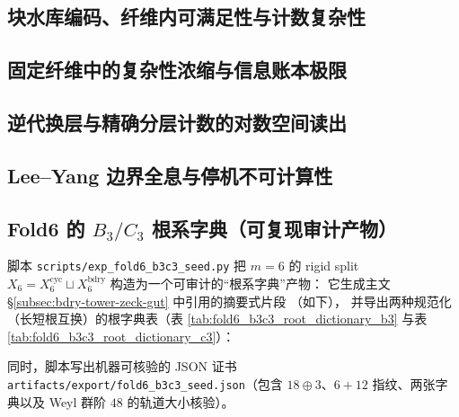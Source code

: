 \subsection{块水库编码、纤维内可满足性与计数复杂性}\label{subsec:fold-computability-block-foldsat}


\subsection{固定纤维中的复杂性浓缩与信息账本极限}\label{subsec:fold-computability-fixed-fiber-ledger-complexity}



\subsection{逆代换层与精确分层计数的对数空间读出}\label{subsec:fold-computability-fiber-level-count-logspace}


\subsection{Lee--Yang 边界全息与停机不可计算性}\label{subsec:fold-computability-leyang-halting-holography}



\subsection{Fold6 的 \texorpdfstring{$B_3/C_3$}{B3/C3} 根系字典（可复现审计产物）}
\label{app:fold6-b3c3-seed-dictionary}

脚本 \texttt{scripts/exp\_fold6\_b3c3\_seed.py} 把 \(m=6\) 的 rigid split
\(
X_6=X_6^{\mathrm{cyc}}\sqcup X_6^{\mathrm{bdry}}
\)
构造为一个可审计的“根系字典”产物：
它生成主文 \S\ref{subsec:bdry-tower-zeck-gut} 中引用的摘要式片段
\verb||（如下），
并导出两种规范化（长短根互换）的根字典表（表 \ref{tab:fold6_b3c3_root_dictionary_b3} 与表 \ref{tab:fold6_b3c3_root_dictionary_c3}）：






同时，脚本写出机器可核验的 JSON 证书 \texttt{artifacts/export/fold6\_b3c3\_seed.json}（包含 \(18\oplus 3\)、\(6+12\) 指纹、两张字典以及 Weyl 群阶 \(48\) 的轨道大小核验）。
